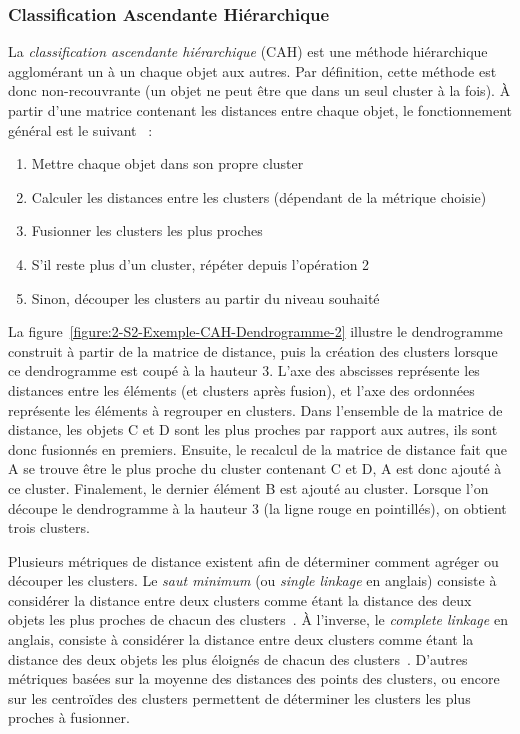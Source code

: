\bigskip

\subsubsection{Classification Ascendante Hiérarchique}
\label{subsubsection:Contexte:TechniquesUtilisees:Clustering:CAH}

La \textit{classification ascendante hiérarchique} (CAH) est une méthode hiérarchique agglomérant un à un chaque objet aux autres.
Par définition, cette méthode est donc non-recouvrante (un objet ne peut être que dans un seul cluster à la fois).
À partir d'une matrice contenant les distances entre chaque objet, le fonctionnement général est le suivant~\cite{xu2008clustering} :

\begin{enumerate}
\item Mettre chaque objet dans son propre cluster
\item Calculer les distances entre les clusters (dépendant de la métrique choisie)
\item Fusionner les clusters les plus proches
\item S'il reste plus d'un cluster, répéter depuis l'opération 2
\item Sinon, découper les clusters au partir du niveau souhaité
\end{enumerate}

\bigskip

La figure~\ref{figure:2-S2-Exemple-CAH-Dendrogramme-2} illustre le dendrogramme construit à partir de la matrice de distance, puis la création des clusters lorsque ce dendrogramme est coupé à la hauteur $ 3 $.
L'axe des abscisses représente les distances entre les éléments (et clusters après fusion), et l'axe des ordonnées représente les éléments à regrouper en clusters.
Dans l'ensemble de la matrice de distance, les objets C et D sont les plus proches par rapport aux autres, ils sont donc fusionnés en premiers.
Ensuite, le recalcul de la matrice de distance fait que A se trouve être le plus proche du cluster contenant C et D, A est donc ajouté à ce cluster.
Finalement, le dernier élément B est ajouté au cluster.
Lorsque l'on découpe le dendrogramme à la hauteur $ 3 $ (la ligne rouge en pointillés), on obtient trois clusters.

\bigskip

Plusieurs métriques de distance existent afin de déterminer comment agréger ou découper les clusters.
Le \textit{saut minimum} (ou \textit{single linkage} en anglais) consiste à considérer la distance entre deux clusters comme étant la distance des deux objets les plus proches de chacun des clusters~\cite{saporta2006probabilites}.
À l'inverse, le \textit{complete linkage} en anglais, consiste à considérer la distance entre deux clusters comme étant la distance des deux objets les plus éloignés de chacun des clusters~\cite{saporta2006probabilites}.
D'autres métriques basées sur la moyenne des distances des points des clusters, ou encore sur les centroïdes des clusters permettent de déterminer les clusters les plus proches à fusionner.

